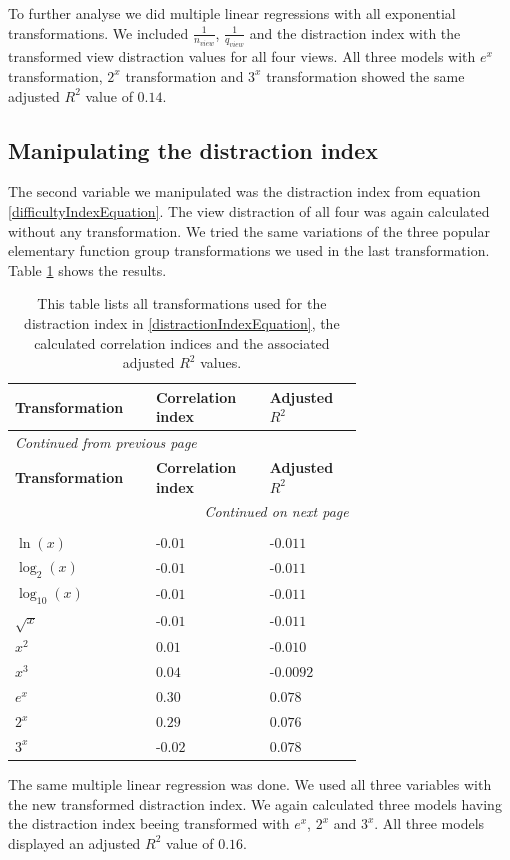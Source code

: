 To further analyse we did multiple linear regressions with all exponential transformations. We included
$\frac{1}{n_{view}}$, $\frac{1}{q_{view}}$ and the distraction index with the transformed view distraction values for all four views. All three models
with $e^x$ transformation, $2^x$ transformation and $3^x$ transformation showed the same adjusted $R^2$ value of $0.14$.


\subsection{Manipulating the distraction index}
The second variable we manipulated was the distraction index from equation \ref{difficultyIndexEquation}. The view distraction of all four was again calculated
without any transformation. We tried the same variations of the three popular elementary function group transformations we used in the last transformation.
Table \ref{distractionIndexTransformations} shows the results.

\begin{longtable}{| p{0.24\linewidth} | p{0.25\linewidth} | p{0.20\linewidth}|}
    \hline
    \textbf{Transformation} & \textbf{Correlation index} & \textbf{Adjusted $R^2$} \\
    \hline
    \endfirsthead
    \multicolumn{3}{l}{{\textit{Continued from previous page}}} \\
    \hline
    \textbf{Transformation} & \textbf{Correlation index} & \textbf{Adjusted $R^2$} \\
    \hline
    \endhead
    \hline \multicolumn{3}{r}{{\textit{Continued on next page}}} \\
    \endfoot
    \hline
    \caption{This table lists all transformations used for the distraction index in \ref{distractionIndexEquation}, the calculated correlation indices and the associated adjusted $R^2$ values. \label{distractionIndexTransformations}}\\
    \endlastfoot
    $ \ln(x) $ & -$0.01$ & -$0.011$ \\
    \hline
    $ \log_{2}(x) $ & -$0.01$ & -$0.011$ \\
    \hline
    $ \log_{10}(x) $ & -$0.01$ & -$0.011$ \\
    \hline
    $ \sqrt{x} $ & -$0.01$ & -$0.011$ \\
    \hline
    $ x^2 $ & $0.01$ & -$0.010$ \\
    \hline
    $ x^3 $ & $0.04$ & -$0.0092$ \\
    \hline
    $ e^x $ & $0.30$ & $0.078$ \\
    \hline
    $ 2^x $ & $0.29$ & $0.076$ \\
    \hline
    $ 3^x $ & -$0.02$ & $0.078$ \\
\end{longtable}
The same multiple linear regression was done. We used all three variables with the new transformed distraction index. We again calculated three
models having the distraction index beeing transformed with $e^x$, $2^x$ and $3^x$. All three models displayed an adjusted $R^2$ value of $0.16$.

